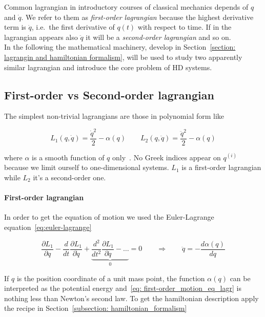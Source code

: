 Common lagrangian in introductory courses of classical mechanics depends of $q$
and $\dot{q}$. We refer to them as \emph{first-order lagrangian} because the
highest derivative term is $\dot{q}$, i.e.\ the first derivative of $q(t)$ with
respect to time. If in the lagrangian appears also $\ddot{q}$ it will be a
\emph{second-order lagrangian} and so on. \\

In the following the mathematical machinery, develop in Section~\ref{section:
lagrangin and hamiltonian formalism}, will be used to study two apparently
similar lagrangian and introduce the core problem of HD systems.

\subsection{First-order vs Second-order lagrangian}
The simplest non-trivial lagrangians are those in polynomial form like

\begin{equation*}
  L_1(q, \dot{q}) = \frac{\dot{q}^2}{2} - \alpha(q) \qquad
  L_2(q, \ddot{q}) = \frac{\ddot{q}^2}{2} - \alpha(q)
\end{equation*}

where $\alpha$ is a smooth function of $q$ only~\cite{Chen13}. No Greek indices
appear on $q^{(i)}$ because we limit ourself to one-dimensional systems. $L_1$
is a first-order lagrangian while $L_2$ it's a second-order one.


\paragraph{First-order lagrangian} In order to get the equation of motion we
used the Euler-Lagrange equation~\eqref{eq:euler-lagrange}

\begin{equation} \label{eq: first-order_motion_eq_lagr}
  \frac{\partial L_1}{\partial q} -
  \frac{d}{dt}\frac{\partial L_1}{\partial \dot{q}} +
  \underbrace{
  \frac{d^2}{dt^2}\frac{\partial L_1}{\partial \ddot{q}} - \ldots }_0 = 0
  \qquad \Rightarrow \qquad
  \ddot{q} = - \frac{d\alpha(q)}{dq}
\end{equation}

If $q$ is the position coordinate of a unit mass point, the function $\alpha(q)$
can be interpreted as the potential energy and~\eqref{eq:
first-order_motion_eq_lagr} is nothing less than Newton's second law. To get the
hamiltonian description apply the recipe in Section~\ref{subsection:
hamiltonian_formalism}

